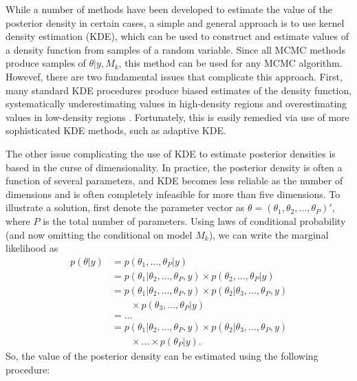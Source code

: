 \documentclass[twocolumn]{article}
\begin{document}
While a number of methods have been developed to estimate the value of the posterior density in certain cases, a simple and general approach is to use kernel density estimation (KDE), which can be used to construct and estimate values of a density function from samples of a random variable. Since all MCMC methods produce samples of $\theta|y, M_k$, this method can be used for any MCMC algorithm. Howevef, there are two fundamental issues that complicate this approach. First, many standard KDE procedures produce biased estimates of the density function, systematically underestimating values in high-density regions and overestimating values in low-density regions \citep{SilvermanDE}. Fortunately, this is easily remedied via use of more sophisticated KDE methods, such as adaptive KDE.

The other issue complicating the use of KDE to estimate posterior densities is based in the curse of dimensionality. In practice, the posterior density is often a function of several parameters, and KDE becomes less reliable as the number of dimensions and is often completely infeasible for more than five dimensions. To illustrate a solution, first denote the parameter vector as $\theta = (\theta_1, \theta_2, ..., \theta_P)',$ where $P$ is the total number of parameters. Using laws of conditional probability (and now omitting the conditional on model $M_k$), we can write the marginal likelihood as
\begin{align}
	p(\theta|y)
	&= p(\theta_1, ..., \theta_P|y) \\
	&= p(\theta_1|\theta_2, ..., \theta_P, y)\times p(\theta_2, ..., \theta_P|y) \\
	&= p(\theta_1|\theta_2, ..., \theta_P, y)\times p(\theta_2|\theta_3, ..., \theta_P, y) \\ &\qquad\times p(\theta_3, ..., \theta_P|y) \\
	&= ... \\
	&= p(\theta_1|\theta_2, ..., \theta_P, y)\times p(\theta_2|\theta_3, ..., \theta_P, y)\\ &\qquad\times ...\times p(\theta_P|y).
\end{align}
So, the value of the posterior density can be estimated using the following procedure:
\end{document}
